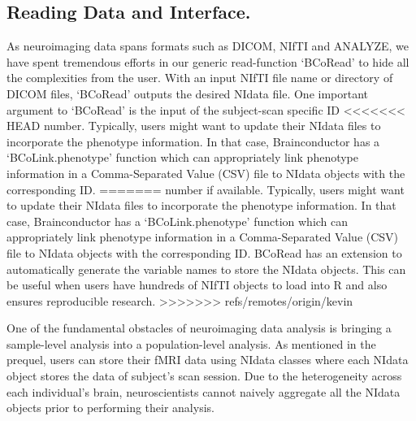\documentclass{nature}
\begin{document}
\subsection{Reading Data and Interface.}
As neuroimaging data spans formats such as DICOM, NIfTI and ANALYZE, we have
spent tremendous efforts in our generic read-function `BCoRead' to hide
all the complexities from the user. With an input NIfTI file name or directory of
DICOM files, `BCoRead' outputs the desired NIdata
file.
One important argument to `BCoRead' is the input of the subject-scan specific ID
<<<<<<< HEAD
number. 
Typically, users might want to update their NIdata files to incorporate the
phenotype information. In that case, Brainconductor has a `BCoLink.phenotype'
function
which can appropriately link phenotype information in a Comma-Separated Value (CSV)
file
to NIdata objects with the corresponding ID.
=======
number if available. 
Typically, users might want to update their NIdata files to incorporate the
phenotype information. In that case, Brainconductor has a `BCoLink.phenotype'
function
which can appropriately link phenotype information in a Comma-Separated Value
(CSV) file to NIdata objects with the corresponding ID. 
BCoRead has an extension to automatically generate the variable names to store
the NIdata objects. This can be useful when users have hundreds of NIfTI
objects to load into R and also ensures reproducible research.
>>>>>>> refs/remotes/origin/kevin

One of the fundamental obstacles of neuroimaging data analysis is bringing a
sample-level
analysis into a population-level analysis. As mentioned in the prequel, users
can
store their fMRI data using NIdata classes where each NIdata object stores the
data of
subject's scan session. Due to the heterogeneity across each individual's brain,
neuroscientists cannot naively aggregate all the NIdata objects prior to
performing their
analysis.
\end{document}

